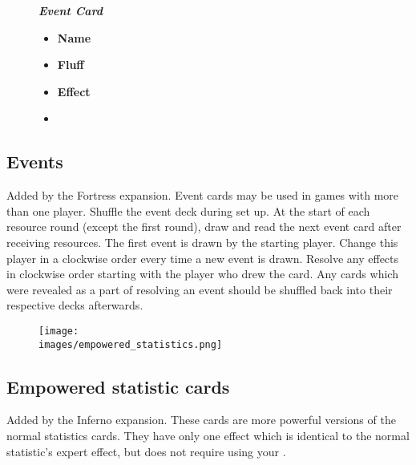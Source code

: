 \begin{wrapfigure}{r}{0.5\textwidth}
  \vspace{0pt}
  \centering
  \begin{scriptsize}
  \end{scriptsize}
  \break
  \footnotesize{\textbf{\textit{\textcolor{darkcandyapplered}{Event Card}}}}
  \scriptsize
  \begin{multicols}{2}
    \begin{itemize}
      \item[\textbf{1.}] \textbf{Name}
      \item[\textbf{2.}] \textbf{Fluff}
      \item[\textbf{3.}] \textbf{Effect}
      \item[\textbf{\phantom{.}}] \phantom{.}
    \end{itemize}
  \end{multicols}
\end{wrapfigure}
\subsection*{Events}
Added by the Fortress expansion.
Event cards may be used in games with more than one player.
Shuffle the event deck during set up.
At the start of each resource round (except the first round), draw and read the next event card after receiving resources.
The first event is drawn by the starting player.
Change this player in a clockwise order every time a new event is drawn.
Resolve any effects in clockwise order starting with the player who drew the card.
Any cards which were revealed as a part of resolving an event should be shuffled back into their respective decks afterwards.

\begin{wrapfigure}{r}{0.5\textwidth}
  \begin{center}
  \texttt{[image: \\images/empowered\_statistics.png]}
  \end{center}
\end{wrapfigure}
\subsection*{Empowered statistic cards}
Added by the Inferno expansion.
These cards are more powerful versions of the normal statistics cards.
They have only one effect which is identical to the normal statistic's expert effect, but does not require using your .

